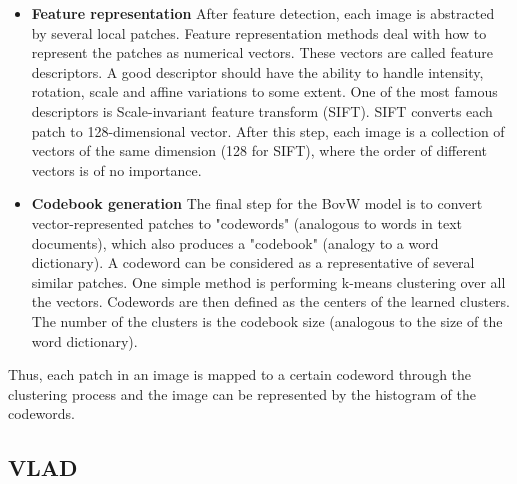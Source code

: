 \documentclass[12pt]{article}
\numberwithin{equation}{section}
\numberwithin{table}{section}
\numberwithin{figure}{section}
\begin{document}
\begin{itemize}

\item \textbf{Feature representation} After feature detection, each image is abstracted by several local patches. Feature representation methods deal with how to represent the patches as numerical vectors. These vectors are called feature descriptors. A good descriptor should have the ability to handle intensity, rotation, scale and affine variations to some extent. One of the most famous descriptors is Scale-invariant feature transform (SIFT). SIFT converts each patch to 128-dimensional vector. After this step, each image is a collection of vectors of the same dimension (128 for SIFT), where the order of different vectors is of no importance.

\item \textbf{Codebook generation} The final step for the BovW model is to convert vector-represented patches to "codewords" (analogous to words in text documents), which also produces a "codebook" (analogy to a word dictionary). A codeword can be considered as a representative of several similar patches. One simple method is performing k-means clustering over all the vectors. Codewords are then defined as the centers of the learned clusters. The number of the clusters is the codebook size (analogous to the size of the word dictionary).

\end{itemize}

\noindent
Thus, each patch in an image is mapped to a certain codeword through the clustering process and the image can be represented by the histogram of the codewords.





\subsection{VLAD} \label{vlad}
\end{document}
